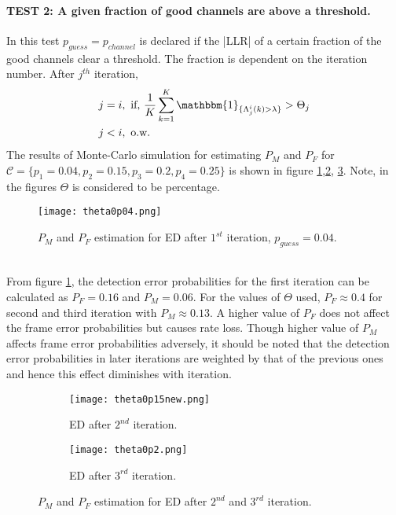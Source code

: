 \documentclass[
11pt, %
a4paper, %
oneside, %
headinclude,footinclude, %
BCOR5mm, %
]{scrartcl}
\begin{document}
\paragraph{TEST 2: A given fraction of good channels are above a threshold.}  
In this test $p_{guess}=p_{channel}$ is declared if the |LLR| of a certain fraction of the good channels clear a threshold. The fraction is dependent on the iteration number. After $j^{th}$ iteration,
\begin{align*}  
j &=i,
 \text{   if, } \frac{1}{K}\sum^K_{k=1} \mathbbm{1}_{\{\Lambda_{j}^i(k) > \lambda\}} > \Theta_j \\
j & < i,  \text{ o.w. }
\end{align*} 
The results of Monte-Carlo simulation for estimating $P_M$ and $P_F$ for $\mathcal{C}=\{p_1=0.04,p_2=0.15,p_3=0.2,p_4=0.25\}$ is shown in figure \ref{fig:theta1},\ref{fig:theta2}, \ref{fig:theta3}. Note, in the figures $\Theta$ is considered to be percentage.
\begin{figure}[h]
 \begin{center}
    \texttt{[image: theta0p04.png]}
  \end{center}
  \caption{$P_M$ and $P_F$ estimation for ED after $1^{st}$ iteration, $p_{guess}=0.04$.}
  \label{fig:theta1}
\end{figure}\\
From figure \ref{fig:theta1}, the detection error probabilities for the first  iteration can be calculated as $P_F=0.16$ and $P_M=0.06$. For the values of $\Theta$ used, $P_F\approx0.4$  for second and third iteration with $P_M\approx0.13$. A higher value of $P_F$ does not affect the frame error probabilities but causes rate loss. Though higher value of $P_M$ affects frame error probabilities adversely, it should be noted that the detection error probabilities in later iterations are weighted by that of the previous ones and hence this effect diminishes with iteration.
\begin{figure}[h]
\centering
\begin{subfigure}{0.5\textwidth}
    \centering
    \texttt{[image: theta0p15new.png]}
    \caption{ED after $2^{nd}$ iteration.}
    \label{fig:theta2}
\end{subfigure}
\begin{subfigure}{0.5\textwidth}
    \centering
    \texttt{[image: theta0p2.png]}
    \caption{ED after $3^{rd}$ iteration.}
    \label{fig:theta3}
\end{subfigure}
\caption{$P_M$ and $P_F$ estimation for ED after $2^{nd}$ and $3^{rd}$ iteration.}
\label{fig:theta23}
\end{figure}
\end{document}
